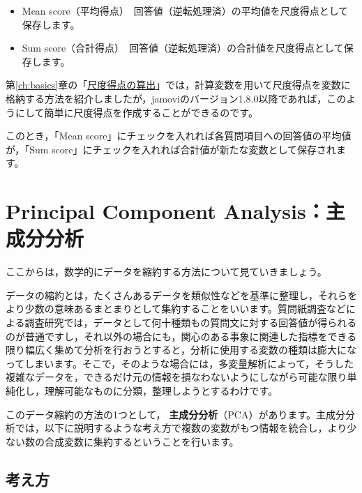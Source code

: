 \documentclass[
  12pt,
  a5jpaper,
  lualatex, ja=standard]{bxjsbook}
\providecommand{\tightlist}{%
  \setlength{\itemsep}{0pt}\setlength{\parskip}{0pt}}
\renewcommand{\emph}[1]{\textbf{\color{emph} #1}}
\newenvironment{jmvsettings}{%
	\begin{center}%
	\begin{tcolorbox}[%
		title=設定項目,
		colframe=gmoji,
		colbacktitle=gmoji,
		colback=gmoji!2!white,
		breakable,
		width=.9\textwidth,
		]\small\addtolength{\leftmargini}{-3\labelsep}%
	}%
	{\end{tcolorbox}\end{center}}
\begin{document}
\begin{jmvsettings}

\begin{itemize}
\tightlist
\item
  Mean score（平均得点）　回答値（逆転処理済）の平均値を尺度得点として保存します。
\item
  Sum score（合計得点）　回答値（逆転処理済）の合計値を尺度得点として保存します。
\end{itemize}

\end{jmvsettings}

第\ref{ch:basics}章の「\href{sec-practice-handling.html\#sub:basics2-scale-score}{尺度得点の算出}」では，計算変数を用いて尺度得点を変数に格納する方法を紹介しましたが，jamoviのバージョン1.8.0以降であれば，このようにして簡単に尺度得点を作成することができるのです。

このとき，「Mean score」にチェックを入れれば各質問項目への回答値の平均値が，「Sum score」にチェックを入れれば合計値が新たな変数として保存されます。

\hypertarget{sec:factor-pca}{%
\section{Principal Component Analysis：主成分分析}\label{sec:factor-pca}}

ここからは，数学的にデータを縮約する方法について見ていきましょう。

データの縮約とは，たくさんあるデータを類似性などを基準に整理し，それらをより少数の意味あるまとまりとして集約することをいいます。質問紙調査などによる調査研究では，データとして何十種類もの質問文に対する回答値が得られるのが普通ですし，それ以外の場合にも，関心のある事象に関連した指標をできる限り幅広く集めて分析を行おうとすると，分析に使用する変数の種類は膨大になってしまいます。そこで，そのような場合には，多変量解析によって，そうした複雑なデータを，できるだけ元の情報を損なわないようにしながら可能な限り単純化し，理解可能なものに分類，整理しようとするわけです。

このデータ縮約の方法の1つとして，\emph{主成分分析}（PCA）があります。主成分分析では，以下に説明するような考え方で複数の変数がもつ情報を統合し，より少ない数の合成変数に集約するということを行います。

\hypertarget{ux8003ux3048ux65b9}{%
\subsection{考え方}\label{ux8003ux3048ux65b9}}
\end{document}
